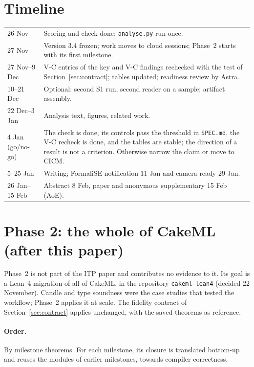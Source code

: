 \documentclass[11pt,a4paper]{article}
\newcommand{\code}[1]{\texttt{#1}}
\begin{document}
\section{Timeline}\label{sec:timeline}
\begin{tabularx}{\textwidth}{@{}lX@{}}
\toprule
26 Nov & Scoring and check done; \code{analyse.py} run once.\\
27 Nov & Version 3.4 frozen; work moves to cloud sessions; Phase~2 starts with its first milestone.\\
27 Nov--9 Dec & V-C entries of the key and V-C findings rechecked with the test of Section~\ref{sec:contract}; tables updated; readiness review by Astra.\\
10--21 Dec & Optional: second S1 run, second reader on a sample; artifact assembly.\\
22 Dec--3 Jan & Analysis text, figures, related work.\\
4 Jan (go/no-go) & The check is done, its controls pass the threshold in \code{SPEC.md}, the V-C recheck is done, and the tables are stable; the direction of a result is not a criterion. Otherwise narrow the claim or move to CICM.\\
5--25 Jan & Writing; FormaliSE notification 11 Jan and camera-ready 29 Jan.\\
26 Jan--15 Feb & Abstract 8 Feb, paper and anonymous supplementary 15 Feb (AoE).\\
\bottomrule
\end{tabularx}

\section{Phase 2: the whole of CakeML (after this paper)}\label{sec:phase2}
Phase~2 is not part of the ITP paper and contributes no evidence to it. Its goal is a Lean~4 migration of all of CakeML, in the repository \code{cakeml-lean4} (decided 22 November). Candle and type soundness were the case studies that tested the workflow; Phase~2 applies it at scale. The fidelity contract of Section~\ref{sec:contract} applies unchanged, with the saved theorems as reference.

\paragraph{Order.} By milestone theorems. For each milestone, its closure is translated bottom-up and reuses the modules of earlier milestones, towards compiler correctness.
\end{document}
